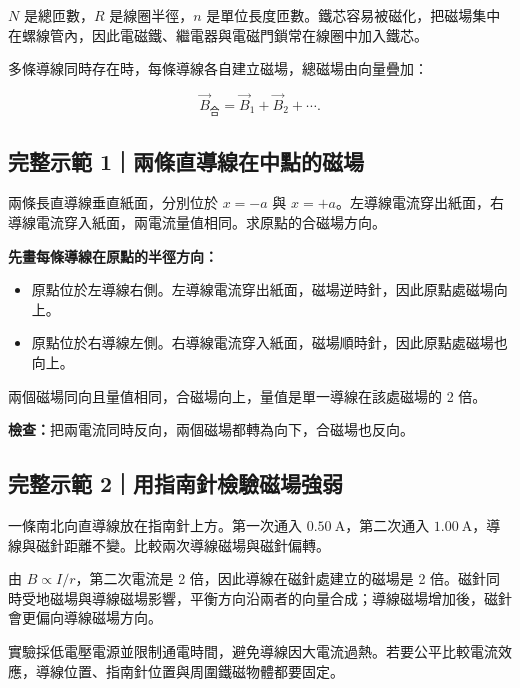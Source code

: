 \documentclass[11pt,a4paper]{article}
\providecommand{\tightlist}{%
  \setlength{\itemsep}{0pt}\setlength{\parskip}{0pt}}
\begin{document}
\(N\) 是總匝數，\(R\) 是線圈半徑，\(n\) 是單位長度匝數。鐵芯容易被磁化，把磁場集中在螺線管內，因此電磁鐵、繼電器與電磁門鎖常在線圈中加入鐵芯。

多條導線同時存在時，每條導線各自建立磁場，總磁場由向量疊加：

\[
\vec B_{\text{合}}=\vec B_1+\vec B_2+\cdots.
\]

\begin{HandoutWorkedExample}

\subsection{完整示範 1｜兩條直導線在中點的磁場}\label{ux5b8cux6574ux793aux7bc4-1ux5169ux689dux76f4ux5c0eux7ddaux5728ux4e2dux9edeux7684ux78c1ux5834}

兩條長直導線垂直紙面，分別位於 \(x=-a\) 與 \(x=+a\)。左導線電流穿出紙面，右導線電流穿入紙面，兩電流量值相同。求原點的合磁場方向。

\textbf{先畫每條導線在原點的半徑方向：}

\begin{itemize}
\tightlist
\item
  原點位於左導線右側。左導線電流穿出紙面，磁場逆時針，因此原點處磁場向上。
\item
  原點位於右導線左側。右導線電流穿入紙面，磁場順時針，因此原點處磁場也向上。
\end{itemize}

兩個磁場同向且量值相同，合磁場向上，量值是單一導線在該處磁場的 2 倍。

\textbf{檢查：}把兩電流同時反向，兩個磁場都轉為向下，合磁場也反向。

\end{HandoutWorkedExample}

\begin{HandoutWorkedExample}

\subsection{完整示範 2｜用指南針檢驗磁場強弱}\label{ux5b8cux6574ux793aux7bc4-2ux7528ux6307ux5357ux91ddux6aa2ux9a57ux78c1ux5834ux5f37ux5f31}

一條南北向直導線放在指南針上方。第一次通入 \(0.50\ \mathrm A\)，第二次通入 \(1.00\ \mathrm A\)，導線與磁針距離不變。比較兩次導線磁場與磁針偏轉。

由 \(B\propto I/r\)，第二次電流是 2 倍，因此導線在磁針處建立的磁場是 2 倍。磁針同時受地磁場與導線磁場影響，平衡方向沿兩者的向量合成；導線磁場增加後，磁針會更偏向導線磁場方向。

實驗採低電壓電源並限制通電時間，避免導線因大電流過熱。若要公平比較電流效應，導線位置、指南針位置與周圍鐵磁物體都要固定。

\end{HandoutWorkedExample}
\end{document}
